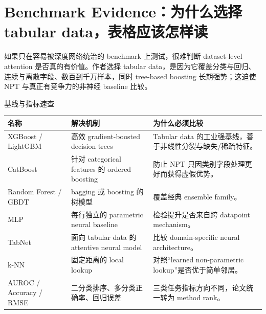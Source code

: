 \section{Benchmark Evidence：为什么选择 tabular data，表格应该怎样读}

如果只在容易被深度网络统治的 benchmark 上测试，很难判断 dataset-level attention 是否真的有价值。作者选择 tabular data，是因为它覆盖分类与回归、连续与离散字段、数百到千万样本，同时 tree-based boosting 长期强势；这迫使 NPT 与真正有竞争力的非神经 baseline 比较。


\begin{knowledgebox}{基线与指标速查}
\begin{tabularx}{\textwidth}{L{0.19\textwidth}L{0.25\textwidth}>{\raggedright\arraybackslash}X}
\toprule
名称 & 解决机制 & 为什么必须比较 \\
\midrule
XGBoost / LightGBM & 高效 gradient-boosted decision trees & Tabular data 的工业强基线，善于非线性分裂与缺失/稀疏特征。 \\
CatBoost & 针对 categorical features 的 ordered boosting & 防止 NPT 只因类别字段处理更好而获得虚假优势。 \\
Random Forest / GBDT & bagging 或 boosting 的树模型 & 覆盖经典 ensemble family。 \\
MLP & 每行独立的 parametric neural baseline & 检验提升是否来自跨 datapoint mechanism。 \\
TabNet & 面向 tabular data 的 attentive neural model & 比较 domain-specific neural architecture。 \\
k-NN & 固定距离的 local lookup & 对照“learned non-parametric lookup”是否优于简单邻居。 \\
AUROC / Accuracy / RMSE & 二分类排序、多分类正确率、回归误差 & 三类任务指标方向不同，论文统一转为 method rank。 \\
\bottomrule
\end{tabularx}
\end{knowledgebox}



